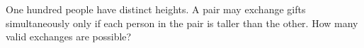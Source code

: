 One hundred people have distinct heights. A pair may exchange gifts simultaneously only if each person in the pair is taller than the other. How many valid exchanges are possible?

